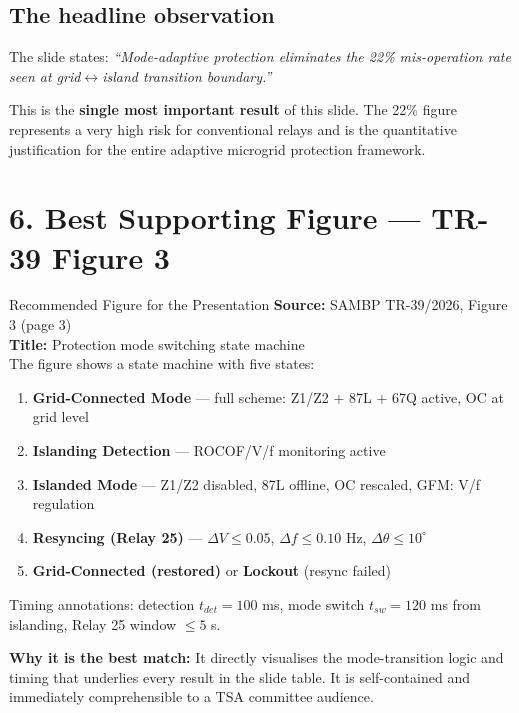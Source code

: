 \documentclass[12pt,a4paper]{article}
\begin{document}
\subsection{The headline observation}

The slide states: \emph{``Mode-adaptive protection eliminates the 22\% mis-operation
rate seen at grid$\leftrightarrow$island transition boundary.''}

This is the \textbf{single most important result} of this slide. The 22\% figure
represents a very high risk for conventional relays and is the quantitative
justification for the entire adaptive microgrid protection framework.

\section{6.\; Best Supporting Figure — TR-39 Figure 3}

\begin{keybox}{Recommended Figure for the Presentation}
\textbf{Source:} SAMBP TR-39/2026, Figure 3 (page 3)\\
\textbf{Title:} Protection mode switching state machine\\[4pt]
The figure shows a state machine with five states:
\begin{enumerate}[nosep]
  \item \textbf{Grid-Connected Mode} — full scheme: Z1/Z2 + 87L + 67Q active, OC at grid level
  \item \textbf{Islanding Detection} — ROCOF/V/f monitoring active
  \item \textbf{Islanded Mode} — Z1/Z2 disabled, 87L offline, OC rescaled, GFM: V/f regulation
  \item \textbf{Resyncing (Relay 25)} — $\Delta V \leq 0.05$, $\Delta f \leq 0.10$ Hz,
        $\Delta\theta \leq 10^\circ$
  \item \textbf{Grid-Connected (restored)} or \textbf{Lockout} (resync failed)
\end{enumerate}
Timing annotations: detection $t_{det} = 100$ ms, mode switch $t_{sw} = 120$ ms from islanding,
Relay 25 window $\leq 5$ s.

\textbf{Why it is the best match:} It directly visualises the mode-transition logic
and timing that underlies every result in the slide table. It is self-contained and
immediately comprehensible to a TSA committee audience.
\end{keybox}
\end{document}
